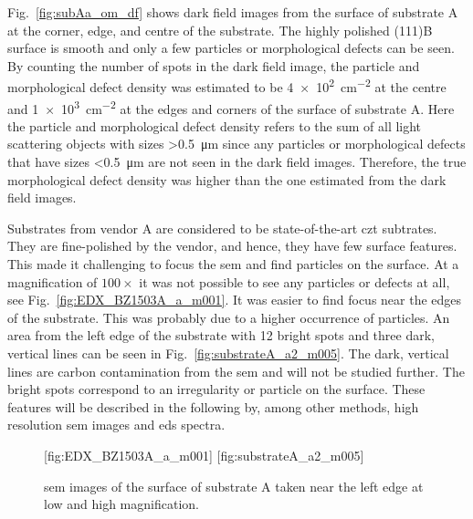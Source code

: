 Fig.~\ref{fig:subAa_om_df} shows dark field images from the surface of substrate A at the corner, edge, and centre of the substrate. The highly polished (111)B surface is smooth and only a few particles or morphological defects can be seen. By counting the number of spots in the dark field image, the particle and morphological defect density was estimated to be \SI{4e2}{\centi\metre^{-2}} at the centre and \SI{1e3}{\centi\metre^{-2}} at the edges and corners of the surface of substrate A. Here the particle and morphological defect density refers to the sum of all light scattering objects with sizes \SI{>0.5}{\micro\metre} since any particles or morphological defects that have sizes \SI{<0.5}{\micro\metre} are not seen in the dark field images. Therefore, the true morphological defect density was higher than the one estimated from the dark field images.

Substrates from vendor A are considered to be state-of-the-art \ac{czt} subtrates. They are fine-polished by the vendor, and hence, they have few surface features. This made it challenging to focus the \ac{sem} and find particles on the surface. At a magnification of $100\times$ it was not possible to see any particles or defects at all, see Fig.~\ref{fig:EDX_BZ1503A_a_m001}. It was easier to find focus near the edges of the substrate. This was probably due to a higher occurrence of particles. An area from the left edge of the substrate with 12 bright spots and three dark, vertical lines can be seen in Fig.~\ref{fig:substrateA_a2_m005}. The dark, vertical lines are carbon contamination from the \ac{sem} and will not be studied further. The bright spots correspond to an irregularity or particle on the surface. These features will be described in the following by, among other methods, high resolution \ac{sem} images and \ac{eds} spectra.

\begin{figure}[htbp]
    \centering
    [fig:EDX_BZ1503A_a_m001]
    \hfill
    [fig:substrateA_a2_m005]
    \caption[\Ac{sem} images of substrate A.]{\Acf{sem} images of the surface of substrate A taken near the left edge at  low and  high magnification.}
    \label{fig:subA_overview}
\end{figure}

